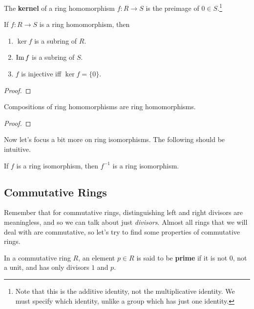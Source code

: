  \begin{definition}[Kernel]
    The \textbf{kernel} of a ring homomorphism $f: R \rightarrow S$ is the preimage of $0 \in S$.\footnote{Note that this is the additive identity, not the multiplicative identity. We must specify which identity, unlike a group which has just one identity.}
  \end{definition}

  \begin{lemma}
    If $f: R \rightarrow S$ is a ring homomorphism, then 
    \begin{enumerate}
      \item $\ker{f}$ is a subring of $R$. 
      \item $\operatorname{Im}{f}$ is a subring of $S$. 
      \item $f$ is injective iff $\ker{f} = \{0\}$. 
    \end{enumerate}
  \end{lemma}
  \begin{proof}

  \end{proof}

  \begin{theorem}
    Compositions of ring homomorphisms are ring homomorphisms. 
  \end{theorem} 
  \begin{proof}
    
  \end{proof}

  Now let's focus a bit more on ring isomorphisms. The following should be intuitive. 

  \begin{lemma}
    If $f$ is a ring isomorphism, then $f^{-1}$ is a ring isomorphism. 
  \end{lemma} 

\subsection{Commutative Rings} 

  Remember that for commutative rings, distinguishing left and right divisors are meaningless, and so we can talk about just \textit{divisors}. Almost all rings that we will deal with are commutative, so let's try to find some properties of commutative rings.  

  \begin{definition}
    In a commutative ring $R$, an element $p \in R$ is said to be \textbf{prime} if it is not $0$, not a unit, and has only divisors $1$ and $p$. 
  \end{definition}

